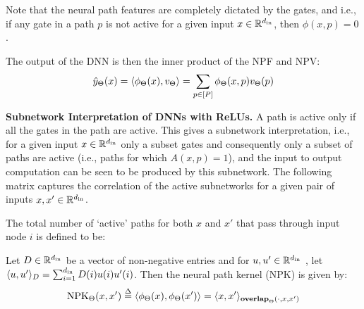 Note that the neural path features are completely dictated by the gates, and i.e., if any gate in a path $p$ is not active for a given input $x\in\mathbb{R}^{d_{\text{in}}}$, then $\phi(x,p)=0$.
\begin{proposition}\label{prop:npf-npv}
The output of the DNN is then the inner product of the NPF and NPV: 
\begin{align}\label{eq:inner}
\hat{y}_{\Theta}(x)=\langle \phi_{\Theta}(x),v_{\Theta}\rangle=\sum_{p\in[P]}  \phi_{\Theta}(x,p) v_{\Theta}(p)
\end{align}
\end{proposition}
\textbf{Subnetwork Interpretation of DNNs with ReLUs.} A path is active only if all the gates in the path are active. This gives a subnetwork interpretation, i.e., for a given input $x\in\mathbb{R}^{d_{\text{in}}}$ only a subset gates and consequently only a subset of paths are active (i.e., paths for which $A(x,p)=1$), and the input to output computation can be seen to be produced by this subnetwork. The following matrix captures the correlation of the active subnetworks for a given pair of inputs $x,x'\in\mathbb{R}^{d_{\text{in}}}$.
\begin{definition}\label{def:overlap} 
The total number of `active' paths for both $x$ and $x'$ that pass through input node $i$ is defined to be:

{\par}
\end{definition}
\begin{lemma}\label{lm:npk}
Let $D\in\mathbb{R}^{d_{\text{in}}}$ be a vector of non-negative entries  and for $u,u'\in\mathbb{R}^{d_{\text{in}}}$ , let $\langle u,u'\rangle_{D}=\sum_{i=1}^{d_{\text{in}}}D(i)u(i)u'(i)$. Then the neural path kernel (NPK) is given by: 
\begin{align*} 
\text{NPK}_{\Theta}(x,x')\stackrel{\Delta}{=} \langle \phi_{\Theta}(x),\phi_{\Theta}(x')\rangle= \langle x,x'\rangle_{\textbf{overlap}_{\Theta}(\cdot,x,x')} 
\end{align*}
\end{lemma}




